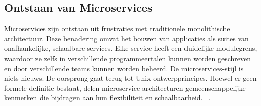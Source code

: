 \subsection*{Ontstaan van Microservices}
Microservices zijn ontstaan uit frustraties met traditionele monolithische architectuur. Deze benadering omvat het bouwen van applicaties als suites van onafhankelijke, schaalbare services. Elke service heeft een duidelijke modulegrens, waardoor ze zelfs in verschillende programmeertalen kunnen worden geschreven en door verschillende teams kunnen worden beheerd. De microservices-stijl is niets nieuws. De oorsprong gaat terug tot Unix-ontwerpprincipes. Hoewel er geen formele definitie bestaat, delen microservice-architecturen gemeenschappelijke kenmerken die bijdragen aan hun flexibiliteit en schaalbaarheid. ~\autocite{Fowler2014}.

